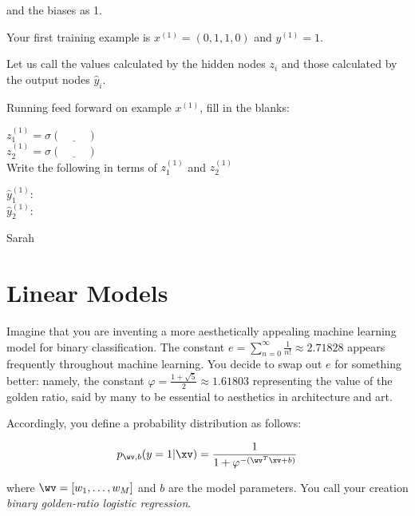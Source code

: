 \begin{enumerate}
    and the biases as 1.
    
    Your first training example is $x^{(1)}=(0, 1, 1, 0)$ and $y^{(1)}=1$.
    
    Let us call the values calculated by the hidden nodes $z_i$ and those calculated by the output nodes $\hat{y}_i$.
    
    Running feed forward on example $x^{(1)}$, fill in the blanks:
    
    $z^{(1)}_1 = \sigma(\underline{\hspace{1cm}})$\\
    $z^{(1)}_2 = \sigma(\underline{\hspace{1cm}})$\\
    
    Write the following in terms of $z^{(1)}_1$ and $z^{(1)}_2$
    
    $\hat{y}^{(1)}_1:$\\
    
    
    $\hat{y}^{(1)}_2$:\\
    
    \begin{qauthor}
    Sarah
    \end{qauthor}
    
    
\end{enumerate}

\section{Linear Models}

Imagine that you are inventing a more aesthetically appealing machine learning model for binary classification. The constant $e =\sum_{n=0}^{\infty} \frac{1}{n!}  \approx 2.71828$ appears frequently throughout machine learning. You decide to swap out $e$ for something better: namely, the constant $\varphi = \frac{1 + \sqrt{5}}{2} \approx 1.61803$ representing the value of the golden ratio, said by many to be essential to aesthetics in architecture and art.

Accordingly, you define a probability distribution as follows:

\begin{align} 
p_{\wv, b}(y = 1 | \xv) = \frac{ 1 }{ 1 + \varphi^{- (\wv^T \xv + b)} }
\end{align}

where $\wv = [w_1, \ldots, w_M]$ and $b$ are the model parameters. You call your creation \emph{binary golden-ratio logistic regression}.
